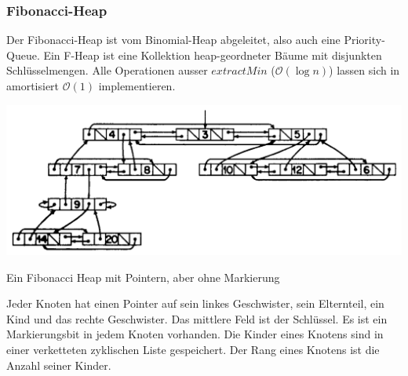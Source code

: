 \documentclass[a4paper, 9pt, DIV=20]{scrartcl}
\newcommand{\Oh}{\mathcal{O}}
\begin{document}
\subsubsection{Fibonacci-Heap} Der Fibonacci-Heap ist vom Binomial-Heap abgeleitet, also auch eine Priority-Queue. Ein F-Heap ist eine Kollektion heap-geordneter Bäume mit disjunkten Schlüsselmengen. Alle Operationen ausser $extractMin$ ($\Oh(\log{n})$) lassen sich in amortisiert $\Oh(1)$ implementieren. 

\begin{center}
\includegraphics[width=\linewidth]{FibonacciHeap}

Ein Fibonacci Heap mit Pointern, aber ohne Markierung
\end{center}
Jeder Knoten hat einen Pointer auf sein linkes Geschwister, sein Elternteil, ein Kind und das rechte Geschwister. Das mittlere Feld ist der Schlüssel. Es ist ein Markierungsbit in jedem Knoten vorhanden. Die Kinder eines Knotens sind in einer verketteten zyklischen Liste gespeichert. Der Rang eines Knotens ist die Anzahl seiner Kinder.
\end{document}
